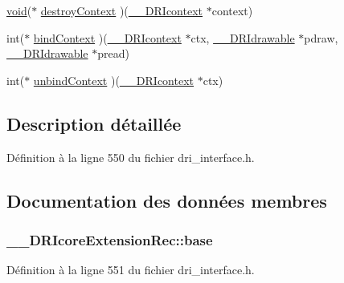 \begin{DoxyCompactItemize}
\item 
\hyperlink{glu_8h_a4292190e3f1f6b373a760c7d9316ad3c}{void}($\ast$ \hyperlink{struct_____d_r_icore_extension_rec_a6f249e0f6b2476facdbef491c056d188}{destroy\-Context} )(\hyperlink{dri__interface_8h_a3fd295cba82b5a3d79f1ee7e12bfb908}{\-\_\-\-\_\-\-D\-R\-Icontext} $\ast$context)
\item 
int($\ast$ \hyperlink{struct_____d_r_icore_extension_rec_a0813f2048a824e6b4103c6f52a210fcf}{bind\-Context} )(\hyperlink{dri__interface_8h_a3fd295cba82b5a3d79f1ee7e12bfb908}{\-\_\-\-\_\-\-D\-R\-Icontext} $\ast$ctx, \hyperlink{dri__interface_8h_a5bfb832a0a08208d95b3bbef439d2262}{\-\_\-\-\_\-\-D\-R\-Idrawable} $\ast$pdraw, \hyperlink{dri__interface_8h_a5bfb832a0a08208d95b3bbef439d2262}{\-\_\-\-\_\-\-D\-R\-Idrawable} $\ast$pread)
\item 
int($\ast$ \hyperlink{struct_____d_r_icore_extension_rec_ae4a43dd34f32ac00dad2e7d789042488}{unbind\-Context} )(\hyperlink{dri__interface_8h_a3fd295cba82b5a3d79f1ee7e12bfb908}{\-\_\-\-\_\-\-D\-R\-Icontext} $\ast$ctx)
\end{DoxyCompactItemize}


\subsection{Description détaillée}


Définition à la ligne 550 du fichier dri\-\_\-interface.\-h.



\subsection{Documentation des données membres}
\hypertarget{struct_____d_r_icore_extension_rec_a5f960f7c4747dbda8574a66c246f2cc0}{
\subsubsection[{base}]{ \-\_\-\-\_\-\-D\-R\-Icore\-Extension\-Rec\-::base}}\label{struct_____d_r_icore_extension_rec_a5f960f7c4747dbda8574a66c246f2cc0}


Définition à la ligne 551 du fichier dri\-\_\-interface.\-h.

